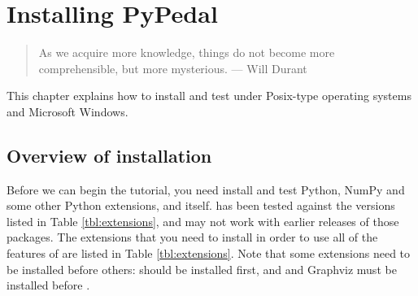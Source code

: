 \chapter{Installing PyPedal}\label{cha:installation}
\begin{quote}
As we acquire more knowledge, things do not become more comprehensible, but more mysterious. --- Will Durant
\end{quote}
This chapter explains how to install and test \PyPedal{} under Posix-type operating systems and Microsoft Windows.

\section{Overview of installation}\label{sec:installation-overview}
Before we can begin the tutorial, you need install and test Python, NumPy and some other Python extensions, and \PyPedal{} itself. \PyPedal{} has been tested against the versions listed in Table \ref{tbl:extensions}, and may not work with earlier releases of those packages. The extensions that you need to install in order to use all of the features of \PyPedal{} are listed in Table \ref{tbl:extensions}.  Note that some extensions need to be installed before others:  should be installed first, and  and Graphviz must be installed before .

